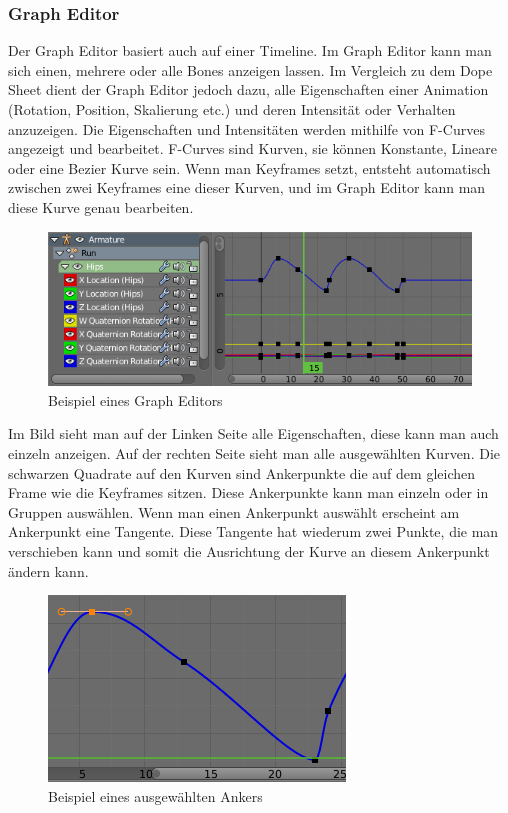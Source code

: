 \subsubsection{Graph Editor}
Der Graph Editor basiert auch auf einer Timeline. Im Graph Editor kann man sich einen, mehrere oder alle Bones anzeigen lassen.
Im Vergleich zu dem Dope Sheet dient der Graph Editor jedoch dazu, alle Eigenschaften einer Animation (Rotation, Position, Skalierung etc.)
und deren Intensität oder Verhalten anzuzeigen. Die Eigenschaften und Intensitäten werden mithilfe von F-Curves angezeigt und bearbeitet. F-Curves
sind Kurven, sie können Konstante, Lineare oder eine Bezier Kurve sein.
Wenn man Keyframes setzt, entsteht automatisch zwischen zwei Keyframes eine dieser Kurven, und im Graph Editor kann man diese Kurve genau bearbeiten.

\begin{figure}[H]
                \centering

                \includegraphics[width=.8\textwidth]{images/animation_graph_editor.PNG}
                \caption{Beispiel eines Graph Editors}
\end{figure}

Im Bild sieht man auf der Linken Seite alle Eigenschaften, diese kann man auch einzeln anzeigen. Auf der rechten Seite sieht man alle ausgewählten Kurven.
Die schwarzen Quadrate auf den Kurven sind Ankerpunkte die auf dem gleichen Frame wie die Keyframes sitzen. Diese Ankerpunkte kann man einzeln oder in Gruppen auswählen.
Wenn man einen Ankerpunkt auswählt erscheint am Ankerpunkt eine Tangente.
Diese Tangente hat wiederum zwei Punkte, die man verschieben kann und somit die Ausrichtung der Kurve an diesem Ankerpunkt ändern kann.

\begin{figure}[H]
    \centering

    \includegraphics[width=.8\textwidth]{images/animation_graph_editor_anker.PNG}
    \caption{Beispiel eines ausgewählten Ankers}
\end{figure}

